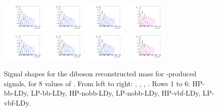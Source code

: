 \begin{figure}[htbp]
  \includegraphics[width=0.18\textwidth]{fig/analysisAppendix/templateSignalVsMX_fromDC_VBFGbuToWW_MVV_mu_HP_vbf_LDy.pdf}
  \includegraphics[width=0.18\textwidth]{fig/analysisAppendix/templateSignalVsMX_fromDC_VBFRadToWW_MVV_mu_HP_vbf_LDy.pdf}
  \includegraphics[width=0.18\textwidth]{fig/analysisAppendix/templateSignalVsMX_fromDC_VBFZprToWW_MVV_mu_HP_vbf_LDy.pdf}
  \includegraphics[width=0.18\textwidth]{fig/analysisAppendix/templateSignalVsMX_fromDC_VBFWprToWZ_MVV_mu_HP_vbf_LDy.pdf}\\
  \includegraphics[width=0.18\textwidth]{fig/analysisAppendix/templateSignalVsMX_fromDC_VBFGbuToWW_MVV_mu_LP_vbf_LDy.pdf}
  \includegraphics[width=0.18\textwidth]{fig/analysisAppendix/templateSignalVsMX_fromDC_VBFRadToWW_MVV_mu_LP_vbf_LDy.pdf}
  \includegraphics[width=0.18\textwidth]{fig/analysisAppendix/templateSignalVsMX_fromDC_VBFZprToWW_MVV_mu_LP_vbf_LDy.pdf}
  \includegraphics[width=0.18\textwidth]{fig/analysisAppendix/templateSignalVsMX_fromDC_VBFWprToWZ_MVV_mu_LP_vbf_LDy.pdf}\\
  \caption{
    Signal shapes for the diboson reconstructed mass \MVV for \VBF-produced signals, for 8 values of \MX.
    From left to right: \GBulktoWW, \RadtoWW, \ZprtoWW, \WprtoWZ.
    Rows 1 to 6: HP-bb-LDy, LP-bb-LDy, HP-nobb-LDy, LP-nobb-LDy, HP-vbf-LDy, LP-vbf-LDy.
  }
  \label{fig:MVVShapes_VBF_LDy}
\end{figure}

